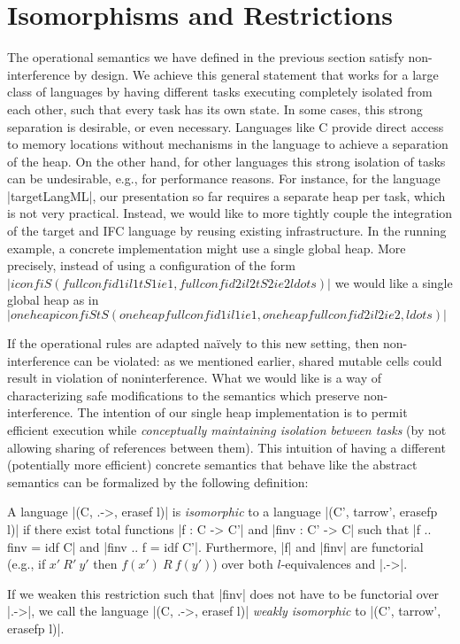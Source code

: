 \section{Isomorphisms and Restrictions}
\label{sec:concrete}

\newcommand{\con}[1]{\ensuremath{{\color{red} #1}}}
\newcommand{\abs}[1]{\ensuremath{{\color{blue} #1}}}

The operational semantics we have defined in the previous section
satisfy non-interference by design.
We achieve this general statement that works for a large class of
languages by having different tasks executing completely isolated from
each other, such that every task has its own state.
In some cases, this strong separation is desirable, or even necessary.
Languages like C provide direct access to memory locations without
mechanisms in the language to achieve a separation of the heap.
On the other hand, for other languages this
strong isolation of tasks can be
undesirable, e.g., for performance reasons.
For instance, for the language |targetLangML|, our presentation so far
requires a separate heap per task, which is not very practical.
Instead, we would like to
more tightly couple the integration of the target and IFC
language by reusing existing infrastructure.  In the running example,
a concrete implementation might use a single global heap.
More precisely, instead of using a configuration of the form
$|iconf iS (fullconf id1 il1 tS1 ie1, fullconf id2 il2 tS2 ie2 ldots)|$
we would like a single global heap as in
$|oneheapiconf iS tS (oneheapfullconf id1 il1 ie1, oneheapfullconf id2 il2 ie2, ldots)|$

If the operational rules are adapted na\"ively to this new setting,
then non-interference can be violated: as we mentioned earlier,
shared mutable cells could result in violation of noninterference.
What we would like is a way of characterizing safe modifications to
the semantics which preserve non-interference.
The intention of our single heap implementation is to permit
efficient execution while \emph{conceptually maintaining isolation between
tasks} (by not allowing sharing of references between them).
This intuition of having a different (potentially more efficient)
concrete semantics that behave like the abstract semantics
can be formalized by the following definition:


\begin{definition}
  A language |(C, .->, erasef l)| is \textit{isomorphic} to a
  language |(C', tarrow', erasefp l)| if there exist total functions |f
  : C -> C'| and |finv : C' -> C| such that |f .. finv = idf C| and |finv
  .. f = idf C'|.  Furthermore, |f| and |finv| are functorial (e.g., if
  $x'\ R'\ y'$ then $f(x')\ R\ f(y')$) over both
  $l$-equivalences and |.->|.
  
  If we weaken this restriction such that |finv| does
  not have to be functorial over |.->|, we call the
  language |(C, .->, erasef l)| \textit{weakly isomorphic} to
  |(C', tarrow', erasefp l)|.
\end{definition}

